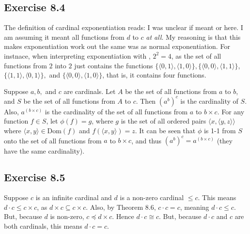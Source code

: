 \documentclass{article}
\theoremstyle{definition}
\begin{document}
\subsection*{Exercise 8.4}
The definition of cardinal exponentiation reads:  I was unclear if  meant  or  here. 
I am assuming it meant all functions from $d$ to $c$ \textit{at all}. My reasoning is that this makes exponentiation work out the same was as normal exponentiation. For 
instnace, when interpreting exponentiation with , $2^2=4$, as the set of all functions from $2$ into $2$ just contains 
the functions $\{\langle 0,1\rangle,\langle 1,0\rangle\},\{\langle 0,0\rangle,\langle 1,1\rangle\}$,
$\{\langle 1,1\rangle,\langle 0,1\rangle\},$ and $\{\langle 0,0\rangle,\langle 1,0\rangle\}$, that is, it contains 
four functions.

Suppose $a,b,$ and $c$ are cardinals. Let $A$ be the set of all functions from 
$a$ to $b$, and $S$ be the set of all functions from $A$ to $c$. Then $(a^b)^c$ is the cardinality of $S$. Also, 
$a^{(b\times c)}$ is the cardinality of the set of all functions from $a$ to $b\times c$. For any function 
$f\in S$, let $\phi(f)=g$, where $g$ is the set of all ordered pairs
$\langle x,\langle y,z\rangle\rangle$ where $\langle x,y\rangle\in\textrm{Dom}(f)$ and 
$f(\langle x,y\rangle)=z$. It can be seen that $\phi$ is 1-1 from $S$ onto  
the set of all functions from $a$ to $b\times c$, and thus $(a^b)^c=a^{(b\times c)}$
(they have the same cardinality). 

\subsection*{Exercise 8.5}
Suppose $c$ is an infinite cardinal and $d$ is a non-zero cardinal $\le c$. This means 
$d\cdot c\le c\times c$, as $d\times c\subseteq c\times c$. Also, by Theorem 8.6, 
$c\cdot c=c$, meaning $d\cdot c\le c$. But, because $d$ is non-zero, 
$c\preceq d\times c$. Hence $d\cdot c\cong c$. But, because $d\cdot c$ and $c$ are both cardinals, this 
means $d\cdot c=c$.
\end{document}
